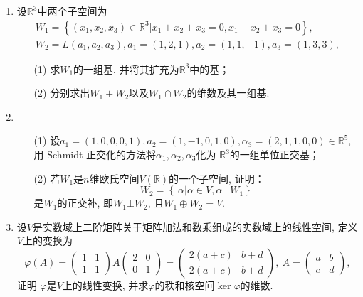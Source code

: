\begin{enumerate}
    \item 设\(\mathbb{R}^3\)中两个子空间为
          \begin{align*}
              W_1 = \left\{ \left( x_1,x_2,x_3 \right) \in \mathbb{R}^3 | x_1 + x_2 + x_3 = 0,x_1 - x_2 + x_3 = 0 \right\}, \\
              W_2 = L\left( a_1,a_2,a_3 \right),a_1 = (1,2,1),a_2 = (1,1, - 1),a_3 = (1,3,3),
          \end{align*}
          \begin{enumerate}
              \item[(1)] 求\(W_1\)的一组基, 并将其扩充为\(\mathbb{R}^3\)中的基；
              \item[(2)] 分别求出\(W_1 + W_2\)以及\(W_1 \cap W_2\)的维数及其一组基.
          \end{enumerate}

    \item
          \begin{enumerate}
              \item[(1)] 设\(a_1 = (1,0,0,0,1),a_2 = (1, - 1,0,1,0),\alpha_3 = (2,1,1,0,0) \in \mathbb{R}^{5}\), 用
                    Schmidt 正交化的方法将\(\alpha_1,\alpha_2,\alpha_3\)化为
                    \(\mathbb{R}^3\)的一组单位正交基；
              \item[(2)] 若\(W_1\)是\(n\)维欧氏空间\(V\left( \mathbb{R} \right)\)的一个子空间, 证明：
                    \[W_2 = \left\{ \left. \ \alpha \right|\alpha \in V,\alpha\bot W_1 \right\}\]
                    是\(W_1\)的正交补, 即\(W_1\bot W_2\), 且\(W_1 \oplus W_2 = V\).
          \end{enumerate}

    \item 设\(V\)是实数域上二阶矩阵关于矩阵加法和数乘组成的实数域上的线性空间, 定义\(V\)上的变换为
          \[\varphi(A) =
              \begin{pmatrix}
                  1 & 1 \\
                  1 & 1
              \end{pmatrix} A \begin{pmatrix}
                  2 & 0 \\
                  0 & 1
              \end{pmatrix} = \begin{pmatrix}
                  2(a + c) & b + d \\
                  2(a + c) & b + d
              \end{pmatrix},\ A = \begin{pmatrix}
                  a & b \\
                  c & d
              \end{pmatrix},\]
          证明 \(\varphi\)是\(V\)上的线性变换, 并求\(\varphi\)的秩和核空间\(\ker\varphi\)的维数.



\end{enumerate}
